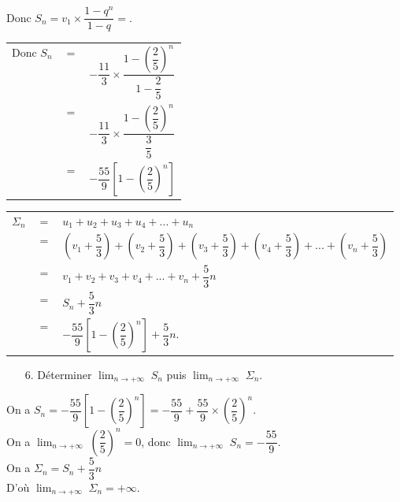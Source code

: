 Donc $S_n = v_1 \times \dfrac{1 - q^{n}}{1 - q} =$. \\

\begin{tabular}{lll}
Donc $S_n$ & $=$ & $-\dfrac{11}{3} \times \dfrac{1 - \left(\dfrac{2}{5}\right)^n}{1 - \dfrac{2}{5}}$ \vspace*{.3cm} \\
& $=$ & $-\dfrac{11}{3} \times \dfrac{1 - \left(\dfrac{2}{5}\right)^n}{\dfrac{3}{5}}$ \vspace*{.3cm} \\
& $=$ & $-\dfrac{55}{9} \left[1 - \left(\dfrac{2}{5}\right)^n\right]$ \\
\end{tabular} 

\vspace*{.3cm}

\begin{tabular}{lll}
$\Sigma_n$ & $=$ & $u_1 + u_2 + u_3 + u_4 + ... + u_n$ \vspace*{.2cm} \\
& $=$ & $\left(v_1 + \dfrac{5}{3}\right) + \left(v_2 + \dfrac{5}{3}\right) + \left(v_3 + \dfrac{5}{3}\right) + \left(v_4 + \dfrac{5}{3}\right) + ... + \left(v_n + \dfrac{5}{3}\right)$ \vspace*{.2cm} \\
& $=$ & $v_1 + v_2 + v_3 + v_4 + ... + v_n + \dfrac{5}{3}n$ \vspace*{.2cm} \\
& $=$ & $S_n + \dfrac{5}{3}n$ \vspace*{.2cm} \\
& $=$ & $-\dfrac{55}{9}\left[1 - \left(\dfrac{2}{5}\right)^n\right] + \dfrac{5}{3}n$. \\
\end{tabular}

\vspace*{.3cm}

\begin{itemize}
\item[6.] Déterminer $ \displaystyle {\lim_{n \rightarrow +\infty}} \; S_n$ puis $ \displaystyle {\lim_{n \rightarrow +\infty}} \; \Sigma_n$. \\
\end{itemize}

On a $S_n = -\dfrac{55}{9} \left[1 - \left(\dfrac{2}{5}\right)^n\right] = -\dfrac{55}{9} + \dfrac{55}{9} \times \left(\dfrac{2}{5}\right)^n$. \\

On a $ \displaystyle {\lim_{n \rightarrow +\infty}} \; \left(\dfrac{2}{5}\right)^n = 0$, donc $ \displaystyle {\lim_{n \rightarrow +\infty}} \; S_n = -\dfrac{55}{9}$. \vspace*{.3cm} \\

On a $\Sigma_n = S_n + \dfrac{5}{3}n$ \\

D'où $ \displaystyle {\lim_{n \rightarrow +\infty}} \; \Sigma_n = +\infty$.

\vspace*{-5cm}


\ifdefined\COMPLETE
\else
    
\fi